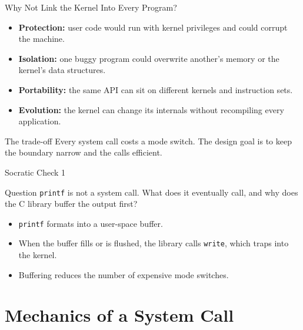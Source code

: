 \documentclass[aspectratio=169]{beamer}
\begin{document}
\begin{frame}{Why Not Link the Kernel Into Every Program?}
  \begin{itemize}
    \item \textbf{Protection:} user code would run with kernel privileges and
      could corrupt the machine.
    \item \textbf{Isolation:} one buggy program could overwrite another's
      memory or the kernel's data structures.
    \item \textbf{Portability:} the same API can sit on different kernels and
      instruction sets.
    \item \textbf{Evolution:} the kernel can change its internals without
      recompiling every application.
  \end{itemize}
  \vspace{0.2cm}
  \begin{alertblock}{The trade-off}
    Every system call costs a mode switch. The design goal is to keep the
    boundary narrow and the calls efficient.
  \end{alertblock}
\end{frame}

\begin{frame}{Socratic Check 1}
  \begin{block}{Question}
    \texttt{printf} is not a system call. What does it eventually call, and
    why does the C library buffer the output first?
  \end{block}
  \vspace{0.25cm}
  \begin{itemize}
    \item \texttt{printf} formats into a user-space buffer.
    \item When the buffer fills or is flushed, the library calls
      \texttt{write}, which traps into the kernel.
    \item Buffering reduces the number of expensive mode switches.
  \end{itemize}
\end{frame}

\section{Mechanics of a System Call}

\end{document}
